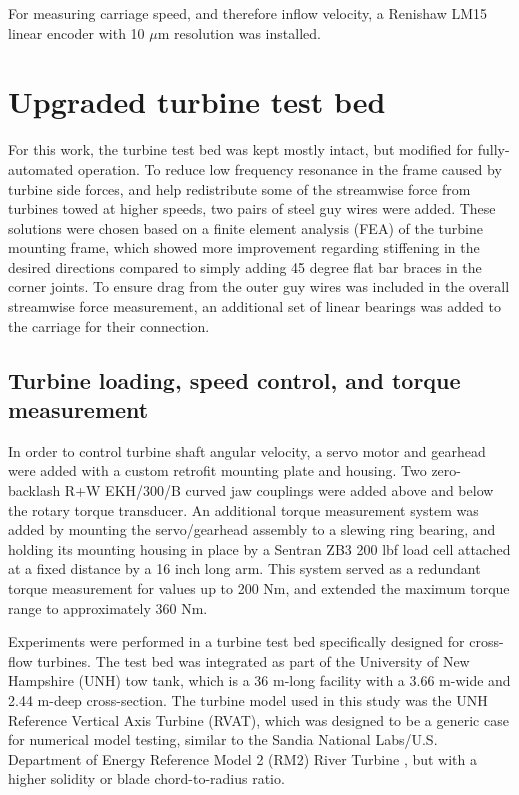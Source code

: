 
For measuring carriage speed, and therefore inflow velocity, a Renishaw LM15
linear encoder with 10 $\mu$m resolution was installed.


\section{Upgraded turbine test bed}

For this work, the turbine test bed was kept mostly intact, but modified for
fully-automated operation. To reduce low frequency resonance in the frame caused
by turbine side forces, and help redistribute some of the streamwise force from
turbines towed at higher speeds, two pairs of steel guy wires were added. These
solutions were chosen based on a finite element analysis (FEA) of the turbine
mounting frame, which showed more improvement regarding stiffening in the
desired directions compared to simply adding 45 degree flat bar braces in the
corner joints. To ensure drag from the outer guy wires was included in the
overall streamwise force measurement, an additional set of linear bearings was
added to the carriage for their connection.


\subsection{Turbine loading, speed control, and torque measurement}

In order to control turbine shaft angular velocity, a servo motor and gearhead
were added with a custom retrofit mounting plate and housing. Two zero-backlash
R+W EKH/300/B curved jaw couplings were added above and below the rotary torque
transducer. An additional torque measurement system was added by mounting the
servo/gearhead assembly to a slewing ring bearing, and holding its mounting
housing in place by a Sentran ZB3 200 lbf load cell attached at a fixed distance
by a 16 inch long arm. This system served as a redundant torque measurement for
values up to 200 Nm, and extended the maximum torque range to approximately 360
Nm.



Experiments were performed in a turbine test bed specifically designed for
cross-flow turbines. The test bed was integrated as part of the University of
New Hampshire (UNH) tow tank, which is a 36 m-long facility with a 3.66 m-wide
and 2.44 m-deep cross-section. The turbine model used in this study was the UNH
Reference Vertical Axis Turbine (RVAT), which was designed to be a generic case
for numerical model testing, similar to the Sandia National Labs/U.S. Department
of Energy Reference Model 2 (RM2) River Turbine \cite{Neary2014}, but with a
higher solidity or blade chord-to-radius ratio.

